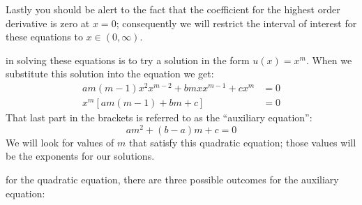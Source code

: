 Lastly you should be alert to the fact that the coefficient for the highest order derivative is zero at $x=0$; consequently we will restrict the interval of interest for these equations to $x \in \left(0,\infty\right)$.

\vspace{4.0cm}

 in solving these equations is to try a solution in the form $u(x)=x^m$.  When we substitute this solution into the equation we get:
\begin{align*}
am(m-1)x^2x^{m-2}+bmxx^{m-1}+cx^m &=0 \\
x^m\left[am(m-1)+bm+c \right]&=0
\end{align*}
That last part in the brackets is referred to as the ``auxiliary equation'':
\begin{equation}
am^2+(b-a)m+c=0
\label{eq:CE-aux}
\end{equation}
We will look for values of $m$ that satisfy this quadratic equation; those values will be the exponents for our solutions.

 for the quadratic equation, there are three possible outcomes for the auxiliary equation: 


